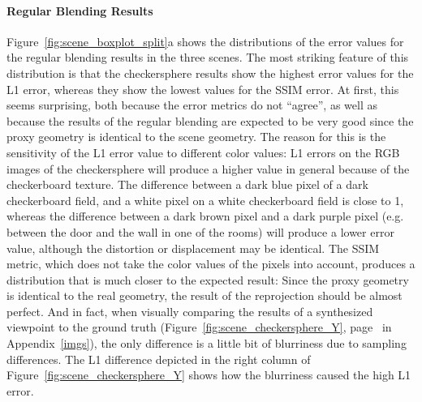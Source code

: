 \paragraph{Regular Blending Results}
Figure~\ref{fig:scene_boxplot_split}a shows the distributions of the error values for the regular blending results in the three scenes. The most striking feature of this distribution is that the checkersphere results show the highest error values for the L1 error, whereas they show the lowest values for the SSIM error. At first, this seems surprising, both because the error metrics do not ``agree'', as well as because the results of the regular blending are expected to be very good since the proxy geometry is identical to the scene geometry. The reason for this is the sensitivity of the L1 error value to different color values: L1 errors on the RGB images of the checkersphere will produce a higher value in general because of the checkerboard texture.
The difference between a dark blue pixel of a dark checkerboard field, and a white pixel on a white checkerboard field is close to 1, whereas the difference between a dark brown pixel and a dark purple pixel (e.g. between the door and the wall in one of the rooms) will produce a lower error value, although the distortion or displacement may be identical. The SSIM metric, which does not take the color values of the pixels into account, produces a distribution that is much closer to the expected result: Since the proxy geometry is identical to the real geometry, the result of the reprojection should be almost perfect. And in fact, when visually comparing the results of a synthesized viewpoint to the ground truth (Figure~\ref{fig:scene_checkersphere_Y}, page~\pageref{fig:scene_checkersphere_Y} in Appendix~\ref{imgs}), the only difference is a little bit of blurriness due to sampling differences. The L1 difference depicted in the right column of Figure~\ref{fig:scene_checkersphere_Y} shows how the blurriness caused the high L1 error.

